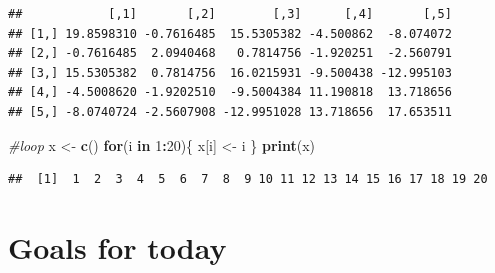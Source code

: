 \documentclass[]{book}
\newenvironment{Shaded}{\begin{snugshade}}{\end{snugshade}}
\newcommand{\KeywordTok}[1]{\textcolor[rgb]{0.13,0.29,0.53}{\textbf{#1}}}
\newcommand{\DataTypeTok}[1]{\textcolor[rgb]{0.13,0.29,0.53}{#1}}
\newcommand{\DecValTok}[1]{\textcolor[rgb]{0.00,0.00,0.81}{#1}}
\newcommand{\StringTok}[1]{\textcolor[rgb]{0.31,0.60,0.02}{#1}}
\newcommand{\CommentTok}[1]{\textcolor[rgb]{0.56,0.35,0.01}{\textit{#1}}}
\newcommand{\ControlFlowTok}[1]{\textcolor[rgb]{0.13,0.29,0.53}{\textbf{#1}}}
\newcommand{\OperatorTok}[1]{\textcolor[rgb]{0.81,0.36,0.00}{\textbf{#1}}}
\newcommand{\NormalTok}[1]{#1}
\theoremstyle{definition}
\theoremstyle{definition}
\theoremstyle{definition}
\theoremstyle{remark}
\begin{document}
\begin{Shaded}
\end{Shaded}

\begin{verbatim}
##            [,1]       [,2]        [,3]      [,4]       [,5]
## [1,] 19.8598310 -0.7616485  15.5305382 -4.500862  -8.074072
## [2,] -0.7616485  2.0940468   0.7814756 -1.920251  -2.560791
## [3,] 15.5305382  0.7814756  16.0215931 -9.500438 -12.995103
## [4,] -4.5008620 -1.9202510  -9.5004384 11.190818  13.718656
## [5,] -8.0740724 -2.5607908 -12.9951028 13.718656  17.653511
\end{verbatim}

\begin{Shaded}
\begin{Highlighting}[]
\CommentTok{#loop }
\NormalTok{x <-}\StringTok{ }\KeywordTok{c}\NormalTok{() }
\ControlFlowTok{for}\NormalTok{(i }\ControlFlowTok{in} \DecValTok{1}\OperatorTok{:}\DecValTok{20}\NormalTok{)\{}
\NormalTok{  x[i] <-}\StringTok{ }\NormalTok{i }
\NormalTok{\}}
\KeywordTok{print}\NormalTok{(x) }
\end{Highlighting}
\end{Shaded}

\begin{verbatim}
##  [1]  1  2  3  4  5  6  7  8  9 10 11 12 13 14 15 16 17 18 19 20
\end{verbatim}

\section{Goals for today}\label{goals-for-today}
\end{document}
